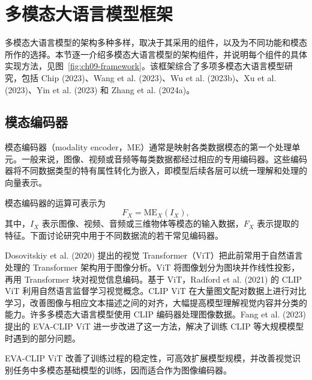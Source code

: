 \section{多模态大语言模型框架}
\label{sec:ch09-framework}
多模态大语言模型的架构多种多样，取决于其采用的组件，以及为不同功能和模态所作的选择。本节逐一介绍多模态大语言模型的架构组件，并说明每个组件的具体实现方法，见图~\ref{fig:ch09-framework}。该框架综合了多项多模态大语言模型研究，包括 Chip (2023)、Wang et al. (2023)、Wu et al. (2023b)、Xu et al. (2023)、Yin et al. (2023) 和 Zhang et al. (2024a)。


\subsection{模态编码器}
\label{sec:ch09-modality-encoder}
\begin{keypoint}
模态编码器（modality encoder，ME）通常是映射各类数据模态的第一个处理单元。一般来说，图像、视频或音频等每类数据都经过相应的专用编码器。这些编码器将不同数据类型的特有属性转化为嵌入，即模型后续各层可以统一理解和处理的向量表示。
\end{keypoint}

模态编码器的运算可表示为
\begin{equation}
F_X=\mathrm{ME}_X(I_X),
\label{eq:ch09-modality-encoder}
\end{equation}
其中，$I_X$ 表示图像、视频、音频或三维物体等模态的输入数据，$F_X$ 表示提取的特征。下面讨论研究中用于不同数据流的若干常见编码器。

Dosovitskiy et al. (2020) 提出的视觉 Transformer（ViT）把此前常用于自然语言处理的 Transformer 架构用于图像分析。ViT 将图像划分为图块并作线性投影，再用 Transformer 块对视觉信息编码。基于 ViT，Radford et al. (2021) 的 CLIP ViT 利用自然语言监督学习视觉概念。CLIP ViT 在大量图文配对数据上进行对比学习，改善图像与相应文本描述之间的对齐，大幅提高模型理解视觉内容并分类的能力。许多多模态大语言模型使用 CLIP 编码器处理图像数据。Fang et al. (2023) 提出的 EVA-CLIP ViT 进一步改进了这一方法，解决了训练 CLIP 等大规模模型时遇到的部分问题。

\begin{practicaltip}
EVA-CLIP ViT 改善了训练过程的稳定性，可高效扩展模型规模，并改善视觉识别任务中多模态基础模型的训练，因而适合作为图像编码器。
\end{practicaltip}

